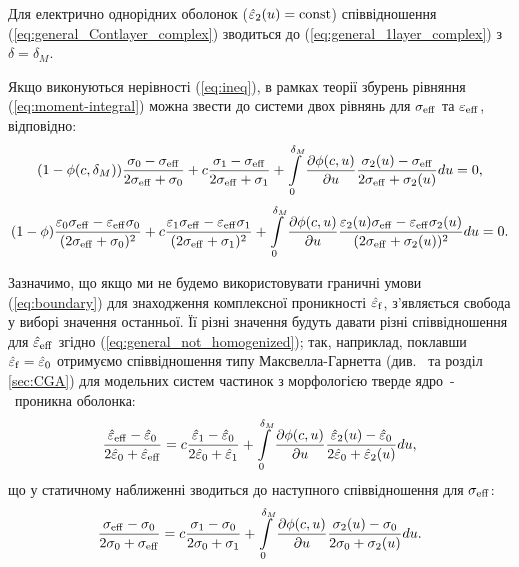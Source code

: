 \documentclass[14pt,twoside]{vakthesis}
\begin{document}
Для електрично однорідних оболонок ($\hat{\varepsilon}_2 (u) = {\rm const}$) співвідношення (\ref{eq:general_Contlayer_complex}) зводиться до (\ref{eq:general_1layer_complex}) з $\delta = \delta_M$.

Якщо виконуються нерівності (\ref{eq:ineq}), в рамках теорії збурень рівняння (\ref{eq:moment-integral}) можна звести до системи двох рівнянь для $\sigma_{\rm eff}$ та $\varepsilon_{\rm eff}$, відповідно:
\begin{equation}\label{eq:general_Contlayer_sigma}
(1 - \phi(c,\delta_M)) \frac{\sigma_0 - \sigma_{\rm eff}}{2\sigma_{\rm eff} + \sigma_0}
+ c \frac{\sigma_1 - \sigma_{\rm eff}}{2\sigma_{\rm eff} + \sigma_1}
+ \int\limits_0^{\delta_M} \frac{\partial \phi(c,u)}{\partial u} \frac{\sigma_2 (u) - \sigma_{\rm eff}}{2\sigma_{\rm eff} + \sigma_2 (u)} du = 0,
\end{equation}
\begin{equation}\label{eq:general_Contlayer_eps}
(1 - \phi) \frac{\varepsilon_0\sigma_{\rm eff} - \varepsilon_{\rm eff}\sigma_0}{(2\sigma_{\rm eff} + \sigma_{0})^2} 
+ c \frac{\varepsilon_1\sigma_{\rm eff} - \varepsilon_{\rm eff}\sigma_1}{(2\sigma_{\rm eff} + \sigma_1)^2}
+ \int\limits_0^{\delta_M} \frac{\partial \phi(c,u)}{\partial u} \frac{\varepsilon_2 (u)\sigma_{\rm eff} - \varepsilon_{\rm eff}\sigma_2 (u)}{(2\sigma_{\rm eff} + \sigma_2 (u))^2} du = 0.
\end{equation}

Зазначимо, що якщо ми не будемо використовувати граничні
умови (\ref{eq:boundary}) для знаходження комплексної проникності $\hat{\varepsilon}_{\rm f}$, з'являється свобода у виборі значення останньої. Її різні значення будуть давати
різні співвідношення для $\hat{\varepsilon}_{\rm eff}$ згідно
(\ref{eq:general_not_homogenized}); так, наприклад, поклавши
$\hat{\varepsilon}_{\rm f} = \hat{\varepsilon}_0$
отримуємо співвідношення типу Максвелла-Гарнетта 
(див.~\cite{Sushko2007,Sushko2009,Sushko2017} та розділ \ref{sec:CGA}) для модельних систем частинок з морфологією тверде ядро~-~проникна оболонка:
\begin{equation}\label{eq:MG-core-shell}
\frac{\hat{\varepsilon}_{\rm eff} - \hat{\varepsilon}_0}{2\hat{\varepsilon}_0 + \hat{\varepsilon}_{\rm eff}} = 
c \frac{\hat{\varepsilon}_1 - \hat{\varepsilon}_0}{2\hat{\varepsilon}_0 + \hat{\varepsilon}_1}
+ \int\limits_0^{\delta_M} \frac{\partial \phi(c,u)}{\partial u} \frac{\hat{\varepsilon}_2 (u) - \hat{\varepsilon}_0}{2\hat{\varepsilon}_0 + \hat{\varepsilon}_2 (u)} du,
\end{equation}
що у статичному наближенні зводиться до наступного співвідношення для
$\sigma_{\rm eff}$:
\begin{equation}\label{eq:MG-core-shell-sigma}
\frac{\sigma_{\rm eff} - \sigma_0}{2\sigma_0 + \sigma_{\rm eff}} = 
c \frac{\sigma_1 - \sigma_0}{2\sigma_0 + \sigma_1}
+ \int\limits_0^{\delta_M} \frac{\partial \phi(c,u)}{\partial u} \frac{\sigma_2 (u) - \sigma_0}{2\sigma_0 + \sigma_2 (u)} du.
\end{equation}
\end{document}
